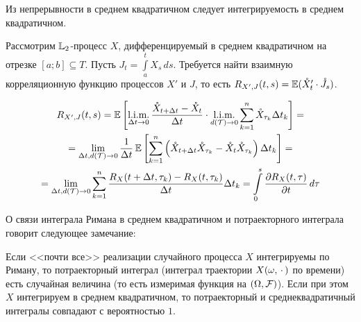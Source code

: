 
\begin{statement}
    \label{statement:calculus:integrability_from_continuity}
    Из непрерывности в среднем квадратичном следует интегрируемость в среднем квадратичном.
\end{statement}


\begin{exercise}
    \label{exercise:calculus:crosscorrelation_derivative_integral}
    Рассмотрим $ \mathbb{L}_2 $-процесс $ X $, дифференцируемый в среднем квадратичном на отрезке $ [a; b] \subseteq T $.
    Пусть $ J_t = \int\limits_a^t X_s \, ds $.
    Требуется найти взаимную корреляционную функцию процессов $ X' $ и $ J $,
    то есть $ R_{X', J}(t, s) = \operatorname{\mathbb{E}} (\mathring{X}_t' \cdot \mathring{J}_s) $.
\end{exercise}

\begin{solution}
    \begin{multline*}
        R_{X', J}(t, s) = \operatorname{\mathbb{E}} \left[ \operatorname*{\textnormal{l.i.m.}}_{\Delta t \to 0} \frac{\mathring{X}_{t + \Delta t} - \mathring{X}_t}{\Delta t} \cdot
        \operatorname*{\textnormal{l.i.m.}}_{d(\mathcal{T}) \to 0} \sum_{k=1}^n \mathring{X}_{\tau_k} \Delta t_k \right] = \\
        = \lim_{\Delta t, d(\mathcal{T}) \to 0} \frac{1}{\Delta t}
        \operatorname{\mathbb{E}} \left[ \sum_{k=1}^n \left( \mathring{X}_{t + \Delta t} \mathring{X}_{\tau_k} - \mathring{X}_t \mathring{X}_{\tau_k} \right) \Delta t_k \right] = \\
        = \lim_{\Delta t, d(\mathcal{T}) \to 0}
        \sum_{k=1}^n \frac{R_X(t + \Delta t, \tau_k) - R_X(t, \tau_k)}{\Delta t} \Delta t_k =
        \int\limits_0^s \frac{\partial R_X(t, \tau)}{\partial t} \, d \tau
    \end{multline*}
\end{solution}


О связи интеграла Римана в среднем квадратичном и потраекторного интеграла говорит следующее замечание:

\begin{remark}
    \label{remark:calculus:trajectories_integrals}
    Если <<почти все>> реализации случайного процесса $ X $ интегрируемы по Риману,
    то потраекторный интеграл (интеграл траектории $ X(\omega, \, \cdot \,) $ по времени)
    есть случайная величина (то есть измеримая функция на $ (\Omega, \mathcal{F}) $).
    Если при этом $ X $ интегрируем в среднем квадратичном,
    то потраекторный и среднеквадратичный интегралы совпадают с вероятностью $ 1 $.
\end{remark}

